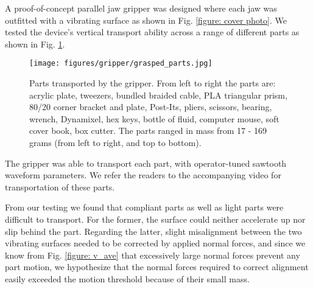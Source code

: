 
A proof-of-concept parallel jaw gripper was designed where each jaw was outfitted with a vibrating surface as shown in Fig. \ref{figure: cover photo}. 
%
We tested the device's vertical transport ability across a range of different parts as shown in Fig. \ref{figure: grasped parts}.
%
\begin{figure}[t]
    \centering
    \texttt{[image: figures/gripper/grasped\_parts.jpg]}
    \caption{Parts transported by the gripper. From left to right the parts are: acrylic plate, tweezers, bundled braided cable, PLA triangular prism, 80/20 corner bracket and plate, Post-Its, pliers, scissors, bearing, wrench, Dynamixel, hex keys, bottle of fluid, computer mouse, soft cover book, box cutter. The parts ranged in mass from 17 - 169 grams (from left to right, and top to bottom).}
    \label{figure: grasped parts}
    \vspace{\shift}
\end{figure}
%
The gripper was able to transport each part, with operator-tuned sawtooth waveform parameters.
%
We refer the readers to the accompanying video for transportation of these parts.

From our testing we found that compliant parts as well as light parts were difficult to transport. 
%
For the former, the surface could neither accelerate up nor slip behind the part. 
% 
Regarding the latter, slight misalignment between the two vibrating surfaces needed to be corrected by applied normal forces, and since we know from Fig. \ref{figure: v_ave} that excessively large normal forces prevent any part motion, we hypothesize that the normal forces required to correct alignment easily exceeded the motion threshold because of their small mass.